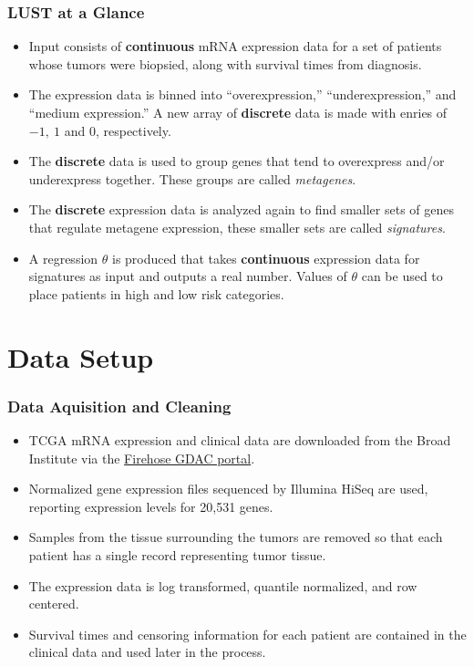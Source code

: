 \documentclass[
	11pt, %
]{beamer}
\begin{document}
\begin{frame}
	\frametitle{LUST at a Glance}
	
	\begin{itemize}
        \item Input consists of \textbf{continuous} mRNA expression data for a set of patients whose tumors were biopsied, along with survival times from diagnosis.
        \pause
        \item The expression data is binned into ``overexpression,'' ``underexpression,'' and ``medium expression.'' A new array of \textbf{discrete} data is made with enries of $-1,\ 1$ and $0$, respectively.
        \pause
        \item The \textbf{discrete} data is used to group genes that tend to overexpress and/or underexpress together. These groups are called \emph{metagenes}. 
        \pause
        \item The \textbf{discrete} expression data is analyzed again to find smaller sets of genes that regulate metagene expression, these smaller sets are called \emph{signatures}.
        \pause
        \item A regression $\theta$ is produced that takes \textbf{continuous} expression data for signatures as input and outputs a real number. Values of $\theta$ can be used to place patients in high and low risk categories. 
    \end{itemize}
\end{frame}


\section{Data Setup}

\begin{frame}
	\frametitle{Data Aquisition and Cleaning}
	
	\begin{itemize}
        \item TCGA mRNA expression and clinical data are downloaded from the Broad Institute via the \href{https://gdac.broadinstitute.org/}{Firehose GDAC portal}.
        \pause
        \item Normalized gene expression files sequenced by Illumina HiSeq are used, reporting expression levels for 20,531 genes.
        \pause
        \item Samples from the tissue surrounding the tumors are removed so that each patient has a single record representing tumor tissue.
        \pause
        \item The expression data is log transformed, quantile normalized, and row centered.
        \pause
        \item Survival times and censoring information for each patient are contained in the clinical data and used later in the process.
    \end{itemize}
\end{frame}
\end{document}
